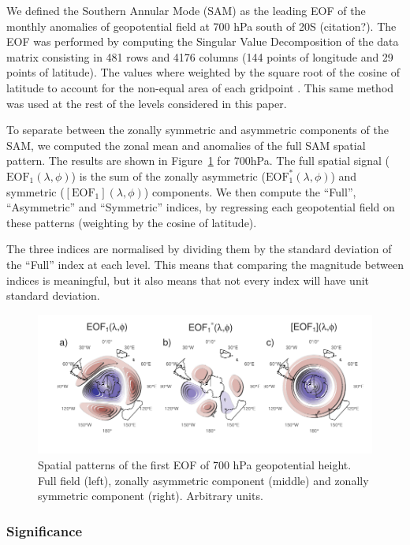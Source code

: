 \documentclass[]{ametsocV5}
\begin{document}
We defined the Southern Annular Mode (SAM) as the leading EOF of the
monthly anomalies of geopotential field at 700 hPa south of 20\degree S
(citation?). The EOF was performed by computing the Singular Value
Decomposition of the data matrix consisting in 481 rows and 4176 columns
(144 points of longitude and 29 points of latitude). The values where
weighted by the square root of the cosine of latitude to account for the
non-equal area of each gridpoint \citep{chung1999}. This same method was
used at the rest of the levels considered in this paper.

To separate between the zonally symmetric and asymmetric components of
the SAM, we computed the zonal mean and anomalies of the full SAM
spatial pattern. The results are shown in Figure~\ref{fig:method} for
700hPa. The full spatial signal (\(\mathrm{EOF_1}(\lambda, \phi)\)) is
the sum of the zonally asymmetric (\(\mathrm{EOF_1^*}(\lambda, \phi)\))
and symmetric (\([\mathrm{EOF_1}](\lambda, \phi)\)) components. We then
compute the ``Full'', ``Asymmetric'' and ``Symmetric'' indices, by
regressing each geopotential field on these patterns (weighting by the
cosine of latitude).

The three indices are normalised by dividing them by the standard
deviation of the ``Full'' index at each level. This means that comparing
the magnitude between indices is meaningful, but it also means that not
every index will have unit standard deviation.

\begin{figure}
\includegraphics{method-1} \caption[Spatial patterns of the first EOF of 700 hPa geopotential height]{Spatial patterns of the first EOF of 700 hPa geopotential height. Full field (left), zonally asymmetric component (middle) and zonally symmetric component (right). Arbitrary units.}\label{fig:method}
\end{figure}

\subsubsection{Significance}
\end{document}
